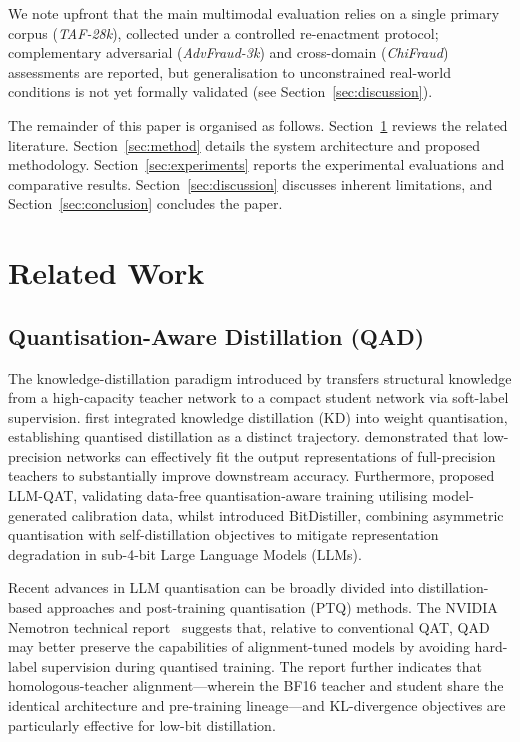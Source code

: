 \documentclass[a4paper,fleqn]{cas-sc}
\begin{document}
\vspace{0.5em}
We note upfront that the main multimodal evaluation relies on a single primary corpus (\textit{TAF-28k}), collected under a controlled re-enactment protocol; complementary adversarial (\textit{AdvFraud-3k}) and cross-domain (\textit{ChiFraud}) assessments are reported, but generalisation to unconstrained real-world conditions is not yet formally validated (see Section~\ref{sec:discussion}).

The remainder of this paper is organised as follows. Section~\ref{sec:related} reviews the related literature. Section~\ref{sec:method} details the system architecture and proposed methodology. Section~\ref{sec:experiments} reports the experimental evaluations and comparative results. Section~\ref{sec:discussion} discusses inherent limitations, and Section~\ref{sec:conclusion} concludes the paper.

\section{Related Work}\label{sec:related}
\subsection{Quantisation-Aware Distillation (QAD)}

The knowledge-distillation paradigm introduced by \citet{4} transfers structural knowledge from a high-capacity teacher network to a compact student network via soft-label supervision. \citet{5} first integrated knowledge distillation (KD) into weight quantisation, establishing quantised distillation as a distinct trajectory. \citet{6} demonstrated that low-precision networks can effectively fit the output representations of full-precision teachers to substantially improve downstream accuracy. Furthermore, \citet{7} proposed LLM-QAT, validating data-free quantisation-aware training utilising model-generated calibration data, whilst \citet{8} introduced BitDistiller, combining asymmetric quantisation with self-distillation objectives to mitigate representation degradation in sub-4-bit Large Language Models (LLMs).

Recent advances in LLM quantisation can be broadly divided into distillation-based approaches and post-training quantisation (PTQ) methods. The NVIDIA Nemotron technical report~\citep{3} suggests that, relative to conventional QAT, QAD may better preserve the capabilities of alignment-tuned models by avoiding hard-label supervision during quantised training. The report further indicates that homologous-teacher alignment---wherein the BF16 teacher and student share the identical architecture and pre-training lineage---and KL-divergence objectives are particularly effective for low-bit distillation.
\end{document}

